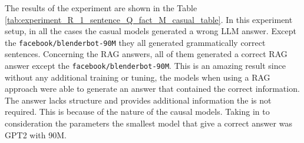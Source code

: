 \documentclass{wseas}
\begin{document}
The results of the experiment are shown in the Table \ref{tab:experiment_R_1_sentence_Q_fact_M_casual_table}.
In this experiment setup, in all the cases the casual models generated a wrong LLM answer. Except
the \texttt{facebook/blenderbot-90M} they all generated grammatically
correct sentences. Concerning the RAG answers, all of them generated a
correct RAG answer except the \texttt{facebook/blenderbot-90M}. This is
an amazing result since without any additional training or tuning, the
models when using a RAG approach were able to generate an answer that 
contained the correct information. The answer lacks structure and provides 
additional information the is not required. This is because of the nature of the causal models.
Taking in to consideration the parameters the smallest model that give a
correct answer was GPT2 with 90M.
\end{document}
